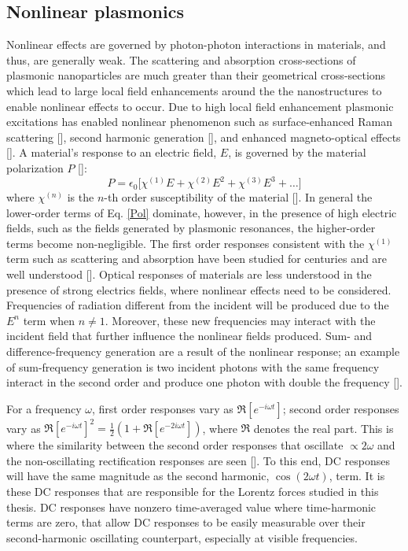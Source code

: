 \subsection{Nonlinear plasmonics}
\par Nonlinear effects are governed by photon-photon interactions in materials, and thus, are generally weak. The scattering and absorption cross-sections of plasmonic nanoparticles are much greater than their geometrical cross-sections which lead to large local field enhancements around the the nanostructures to enable nonlinear effects to occur. Due to high local field enhancement plasmonic excitations has enabled nonlinear phenomenon such as surface-enhanced Raman scattering [\cite{Nie}], second harmonic generation [\cite{Canfield}], and enhanced magneto-optical effects [\cite{Moocarme2014,Belotelov}]. A material's response to an electric field, $E$, is governed by the material polarization $P$ [\cite{Kauranen}]:
\begin{equation}
P = \epsilon_0\big[\chi^{(1)}E+\chi^{(2)}E^2+\chi^{(3)}E^3+\ldots\big]
\label{Pol}
\end{equation}
where $\chi^{(n)}$ is the $n$-th order susceptibility of the material [\cite{Boyd}]. In general the lower-order terms of Eq. \ref{Pol} dominate, however, in the presence of high electric fields, such as the fields generated by plasmonic resonances, the higher-order terms become non-negligible. The first order responses consistent with the $\chi^{(1)}$ term such as scattering and absorption have been studied for centuries and are well understood [\cite{Mie, Hulst}]. Optical responses of materials are less understood in the presence of strong electrics fields,  where nonlinear effects need to be considered. Frequencies of radiation different from the incident will be produced due to the $E^n$ term when $n\neq 1$. Moreover, these new frequencies may interact with the incident field that further influence the nonlinear fields produced. Sum- and difference-frequency generation are a result of the nonlinear response; an example of sum-frequency generation is two incident photons with the same frequency interact in the second order and produce one photon with double the frequency [\cite{Canfield}].

For a frequency $\omega$, first order responses vary as $\Re[e^{-i\omega t}]$; second order responses vary as $\Re[e^{-i\omega t}]^2 = \frac{1}{2}(1+\Re[e^{-2i\omega t}])$, where $\Re$ denotes the real part. This is where the similarity between the second order responses that oscillate $\propto 2\omega$ and the non-oscillating rectification responses are seen [\cite{Shen}]. To this end, DC responses will have the same magnitude  as the second harmonic, $\cos(2\omega t)$, term. It is these DC responses that are responsible for the Lorentz forces studied in this thesis. DC responses have nonzero time-averaged value where time-harmonic terms are zero, that allow DC responses to be easily measurable over their second-harmonic oscillating counterpart, especially at visible frequencies.

